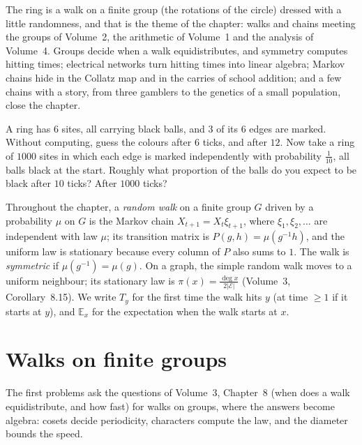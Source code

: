 The ring is a walk on a finite group (the rotations of the circle) dressed with a little randomness, and that is the theme of the
chapter: walks and chains meeting the groups of Volume~2, the arithmetic of Volume~1 and the analysis of Volume~4. Groups decide when
a walk equidistributes, and symmetry computes hitting times; electrical networks turn hitting times into linear algebra; Markov
chains hide in the Collatz map and in the carries of school addition; and a few chains with a story, from three gamblers to the
genetics of a small population, close the chapter.

\begin{think}
A ring has $6$ sites, all carrying black balls, and $3$ of its $6$ edges are marked. Without computing, guess the colours after $6$
ticks, and after $12$. Now take a ring of $1000$ sites in which each edge is marked independently with probability $\frac1{10}$, all balls
black at the start. Roughly what proportion of the balls do you expect to be black after $10$ ticks? After $1000$ ticks?
\end{think}

Throughout the chapter, a \emph{random walk} on a finite group $G$ driven by a probability $\mu$ on $G$ is the Markov chain
$X_{t+1}=X_t\xi_{t+1}$, where $\xi_1,\xi_2,\dots$ are independent with law $\mu$; its transition matrix is $P(g,h)=\mu(g^{-1}h)$, and the
uniform law is stationary because every column of $P$ also sums to $1$. The walk is \emph{symmetric} if $\mu(g^{-1})=\mu(g)$. On a
graph, the simple random walk moves to a uniform neighbour; its stationary law is $\pi(x)=\frac{\deg x}{2|\mathcal E|}$ (Volume~3,
Corollary~8.15). We write $T_y$ for the first time the walk hits $y$ (at time $\ge1$ if it starts at $y$), and $\mathbb E_x$ for the
expectation when the walk starts at $x$.

\section{Walks on finite groups}

The first problems ask the questions of Volume~3, Chapter~8 (when does a walk equidistribute, and how fast) for walks on groups, where
the answers become algebra: cosets decide periodicity, characters compute the law, and the diameter bounds the speed.

